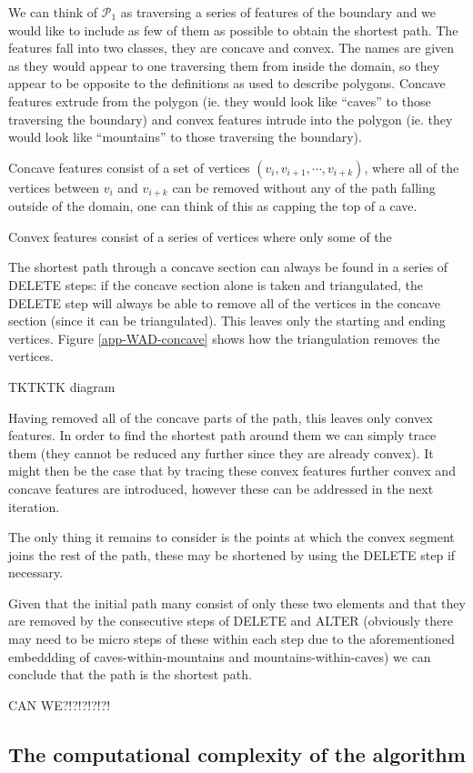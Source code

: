 We can think of $\mathcal{P}_1$ as traversing a series of features of the boundary and we would like to include as few of them as possible to obtain the shortest path. The features fall into two classes, they are concave and convex. The names are given as they would appear to one traversing them from inside the domain, so they appear to be opposite to the definitions as used to describe polygons. Concave features extrude from the polygon (ie. they would look like ``caves'' to those traversing the boundary) and convex features intrude into the polygon (ie. they would look like ``mountains'' to those traversing the boundary).




Concave features consist of a set of vertices $(v_i, v_{i+1},\cdots,v_{i+k})$, where all of the vertices between $v_i$ and $v_{i+k}$ can be removed without any of the path falling outside of the domain, one can think of this as capping the top of a cave.

Convex features consist of a series of vertices where only some of the 


The shortest path through a concave section can always be found in a series of DELETE steps: if the concave section alone is taken and triangulated, the DELETE step will always be able to remove all of the vertices in the concave section (since it can be triangulated). This leaves only the starting and ending vertices. Figure \ref{app-WAD-concave} shows how the triangulation removes the vertices.


TKTKTK diagram

Having removed all of the concave parts of the path, this leaves only convex features. In order to find the shortest path around them we can simply trace them (they cannot be reduced any further since they are already convex). It might then be the case that by tracing these convex features further convex and concave features are introduced, however these can be addressed in the next iteration.

The only thing it remains to consider is the points at which the convex segment joins the rest of the path, these may be shortened by using the DELETE step if necessary.

Given that the initial path many consist of only these two elements and that they are removed by the consecutive steps of DELETE and ALTER (obviously there may need to be micro steps of these within each step due to the aforementioned embeddding of caves-within-mountains and mountains-within-caves) we can conclude that the path is the shortest path.

CAN WE?!?!?!?!?!

\subsection{The computational complexity of the algorithm}





